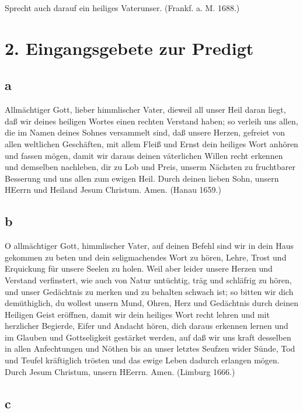 Sprecht auch darauf ein heiliges Vaterunser. (Frankf. a. M. 1688.)

\section{2. Eingangsgebete zur Predigt}

\subsection{a}

Allmächtiger Gott, lieber himmlischer Vater, dieweil all unser Heil daran liegt, daß wir deines heiligen Wortes einen rechten Verstand haben; so verleih uns allen, die im Namen deines Sohnes versammelt sind, daß unsere Herzen, gefreiet von allen weltlichen Geschäften, mit allem Fleiß und Ernst dein heiliges Wort anhören und fassen mögen, damit wir daraus deinen väterlichen Willen recht erkennen und demselben nachleben, dir zu Lob und Preis, unserm Nächsten zu fruchtbarer Besserung und uns allen zum ewigen Heil. Durch deinen lieben Sohn, unsern HEerrn und Heiland Jesum Christum. Amen. (Hanau 1659.)

\subsection{b}

O allmächtiger Gott, himmlischer Vater, auf deinen Befehl sind wir in dein Haus gekommen zu beten und dein seligmachendes Wort zu hören, Lehre, Trost und Erquickung für unsere Seelen zu holen. Weil aber leider unsere Herzen und Verstand verfinstert, wie auch von Natur untüchtig, träg und schläfrig zu hören, und unser Gedächtnis zu merken und zu behalten schwach ist; so bitten wir dich demüthiglich, du wollest unsern Mund, Ohren, Herz und Gedächtnis durch deinen Heiligen Geist eröffnen, damit wir dein heiliges Wort recht lehren und mit herzlicher Begierde, Eifer und Andacht hören, dich daraus erkennen lernen und im Glauben und Gottseligkeit gestärket werden, auf daß wir uns kraft desselben in allen Anfechtungen und Nöthen bis an unser letztes Seufzen wider Sünde, Tod und Teufel kräftiglich trösten und das ewige Leben dadurch erlangen mögen. Durch Jesum Christum, unsern HEerrn. Amen. (Limburg 1666.)

\subsection{c}

